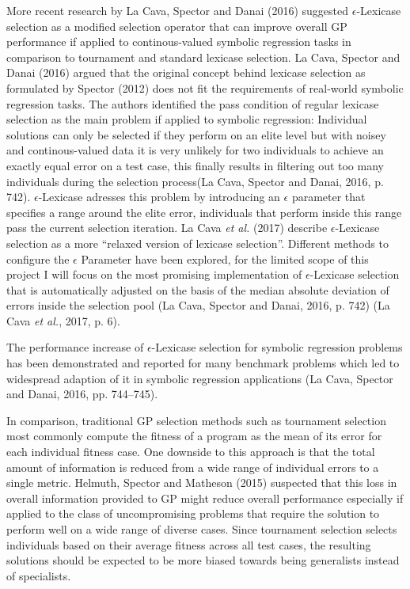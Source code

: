 \documentclass[
  12pt,
]{article}
\begin{document}
More recent research by La Cava, Spector and Danai (2016) suggested
\(\epsilon\)-Lexicase selection as a modified selection operator that
can improve overall GP performance if applied to continous-valued
symbolic regression tasks in comparison to tournament and standard
lexicase selection. La Cava, Spector and Danai (2016) argued that the
original concept behind lexicase selection as formulated by Spector
(2012) does not fit the requirements of real-world symbolic regression
tasks. The authors identified the pass condition of regular lexicase
selection as the main problem if applied to symbolic regression:
Individual solutions can only be selected if they perform on an elite
level but with noisey and continous-valued data it is very unlikely for
two individuals to achieve an exactly equal error on a test case, this
finally results in filtering out too many individuals during the
selection process(La Cava, Spector and Danai, 2016, p. 742).
\(\epsilon\)-Lexicase adresses this problem by introducing an
\(\epsilon\) parameter that specifies a range around the elite error,
individuals that perform inside this range pass the current selection
iteration. La Cava \emph{et al.} (2017) describe \(\epsilon\)-Lexicase
selection as a more ``relaxed version of lexicase selection''. Different
methods to configure the \(\epsilon\) Parameter have been explored, for
the limited scope of this project I will focus on the most promising
implementation of \(\epsilon\)-Lexicase selection that is automatically
adjusted on the basis of the median absolute deviation of errors inside
the selection pool (La Cava, Spector and Danai, 2016, p. 742) (La Cava
\emph{et al.}, 2017, p. 6).

The performance increase of \(\epsilon\)-Lexicase selection for symbolic
regression problems has been demonstrated and reported for many
benchmark problems which led to widespread adaption of it in symbolic
regression applications (La Cava, Spector and Danai, 2016, pp.
744--745).

In comparison, traditional GP selection methods such as tournament
selection most commonly compute the fitness of a program as the mean of
its error for each individual fitness case. One downside to this
approach is that the total amount of information is reduced from a wide
range of individual errors to a single metric. Helmuth, Spector and
Matheson (2015) suspected that this loss in overall information provided
to GP might reduce overall performance especially if applied to the
class of uncompromising problems that require the solution to perform
well on a wide range of diverse cases. Since tournament selection
selects individuals based on their average fitness across all test
cases, the resulting solutions should be expected to be more biased
towards being generalists instead of specialists.
\end{document}
